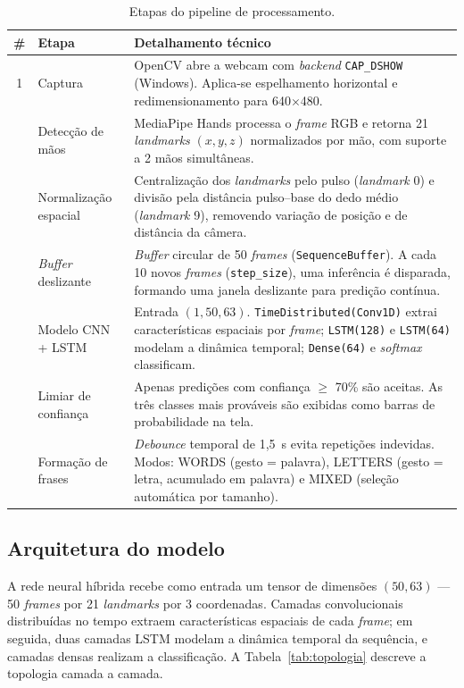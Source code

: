 \begin{table}[htbp]
\centering
\caption{Etapas do pipeline de processamento.}
\label{tab:pipeline}
\small
\begin{tabular}{@{}c p{3cm} p{7.5cm}@{}}
\toprule
\textbf{\#} & \textbf{Etapa} & \textbf{Detalhamento técnico} \\
\midrule
1 & Captura &
OpenCV abre a webcam com \textit{backend} \texttt{CAP\_DSHOW} (Windows).
Aplica-se espelhamento horizontal e redimensionamento para 640$\times$480. \\
\addlinespace
2 & Detecção de mãos &
MediaPipe Hands processa o \textit{frame} RGB e retorna 21 \textit{landmarks}
$(x, y, z)$ normalizados por mão, com suporte a 2 mãos simultâneas. \\
\addlinespace
3 & Normalização espacial &
Centralização dos \textit{landmarks} pelo pulso (\textit{landmark} 0) e divisão
pela distância pulso–base do dedo médio (\textit{landmark} 9), removendo variação
de posição e de distância da câmera. \\
\addlinespace
4 & \textit{Buffer} deslizante &
\textit{Buffer} circular de 50 \textit{frames} (\texttt{SequenceBuffer}). A cada
10 novos \textit{frames} (\texttt{step\_size}), uma inferência é disparada,
formando uma janela deslizante para predição contínua. \\
\addlinespace
5 & Modelo CNN + LSTM &
Entrada $(1, 50, 63)$. \texttt{TimeDistributed(Conv1D)} extrai características
espaciais por \textit{frame}; \texttt{LSTM(128)} e \texttt{LSTM(64)} modelam a
dinâmica temporal; \texttt{Dense(64)} e \textit{softmax} classificam. \\
\addlinespace
6 & Limiar de confiança &
Apenas predições com confiança $\geq$ 70\% são aceitas. As três classes mais
prováveis são exibidas como barras de probabilidade na tela. \\
\addlinespace
7 & Formação de frases &
\textit{Debounce} temporal de 1,5~s evita repetições indevidas. Modos: WORDS
(gesto = palavra), LETTERS (gesto = letra, acumulado em palavra) e MIXED (seleção
automática por tamanho). \\
\bottomrule
\end{tabular}
\end{table}

\subsection{Arquitetura do modelo}
\label{subsec:arquitetura}

A rede neural híbrida recebe como entrada um tensor de dimensões $(50, 63)$ — 50
\textit{frames} por 21 \textit{landmarks} por 3 coordenadas. Camadas
convolucionais distribuídas no tempo extraem características espaciais de cada
\textit{frame}; em seguida, duas camadas LSTM modelam a dinâmica temporal da
sequência, e camadas densas realizam a classificação. A
Tabela~\ref{tab:topologia} descreve a topologia camada a camada.

